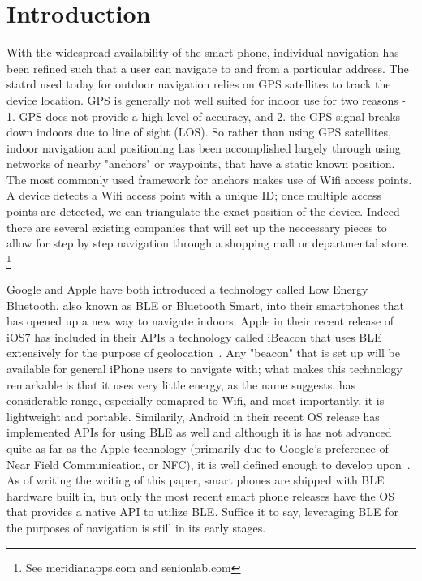 \documentclass{sig-alternate}
\begin{document}
\section{Introduction}
\label{sec:intro}
With the widespread availability of the smart phone, individual navigation
has been refined such that a user can navigate to and from a particular
address. The statrd used today for outdoor navigation relies on GPS
satellites to track the device location. GPS is generally not well suited for
indoor use for two reasons - 1. GPS does not provide a high level of 
accuracy, and 2. the GPS signal breaks down indoors due to line of sight
(LOS). So rather than using GPS satellites, indoor navigation and 
positioning has been accomplished largely through using networks
of nearby "anchors" or waypoints, that have a static known position. 
The most commonly used framework for anchors makes use of Wifi
access points. A device detects a Wifi access point with a unique ID;
once multiple access points are detected, we can triangulate the exact
position of the device. Indeed there are several existing companies
that will set up the neccessary pieces to allow for step by step navigation
through a shopping mall or departmental store.
\footnote{ See meridianapps.com and senionlab.com}

Google and Apple have both introduced a technology called Low Energy
Bluetooth, also known as BLE or Bluetooth Smart, into their smartphones
that has opened up a new way to navigate indoors. Apple in their recent
release of iOS7 has included in their APIs a technology called iBeacon
that uses BLE extensively for the purpose of geolocation~\cite{apple}.
Any "beacon" that is set up will be available for general iPhone users to 
navigate with; what makes this technology remarkable is that it uses very 
little energy, as the name suggests, has considerable range, especially
comapred to Wifi, and most importantly, it is lightweight and portable.
Similarily, Android in their recent OS release has implemented APIs
for using BLE as well and although it is has not advanced quite as far as
the Apple technology (primarily due to Google's preference of Near
Field Communication, or NFC), it is well defined enough to develop
upon~\cite{android}. As of writing the writing of this paper, smart phones are shipped
with BLE hardware built in, but only the most recent smart phone
releases have the OS that provides a native API to utilize BLE. Suffice
it to say, leveraging BLE for the purposes of navigation is still in its
early stages.
\end{document}
